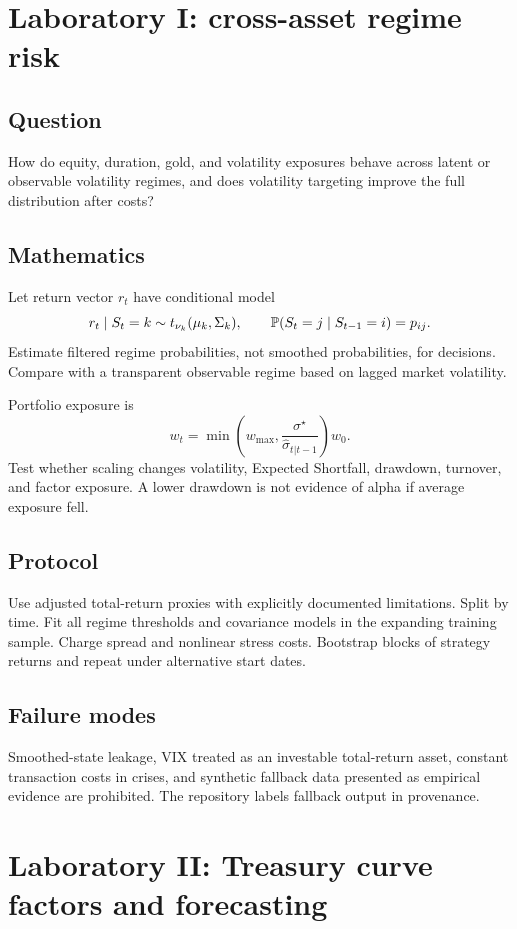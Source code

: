 \section{Laboratory I: cross-asset regime risk}

\subsection*{Question}
How do equity, duration, gold, and volatility exposures behave across latent or
observable volatility regimes, and does volatility targeting improve the full
distribution after costs?

\subsection*{Mathematics}
Let return vector $r_t$ have conditional model
\[
r_t\mid S_t=k\sim t_{\nu_k}(\mu_k,\Sigma_k),\qquad
\mathbb P(S_t=j\mid S_{t-1}=i)=p_{ij}.
\]
Estimate filtered regime probabilities, not smoothed probabilities, for decisions.
Compare with a transparent observable regime based on lagged market volatility.

Portfolio exposure is
\[
w_t=\min\left(w_{\max},
\frac{\sigma^\star}{\widehat\sigma_{t|t-1}}\right)w_0.
\]
Test whether scaling changes volatility, Expected Shortfall, drawdown, turnover, and
factor exposure. A lower drawdown is not evidence of alpha if average exposure fell.

\subsection*{Protocol}
Use adjusted total-return proxies with explicitly documented limitations. Split by
time. Fit all regime thresholds and covariance models in the expanding training
sample. Charge spread and nonlinear stress costs. Bootstrap blocks of strategy
returns and repeat under alternative start dates.

\subsection*{Failure modes}
Smoothed-state leakage, VIX treated as an investable total-return asset, constant
transaction costs in crises, and synthetic fallback data presented as empirical
evidence are prohibited. The repository labels fallback output in provenance.

\section{Laboratory II: Treasury curve factors and forecasting}

